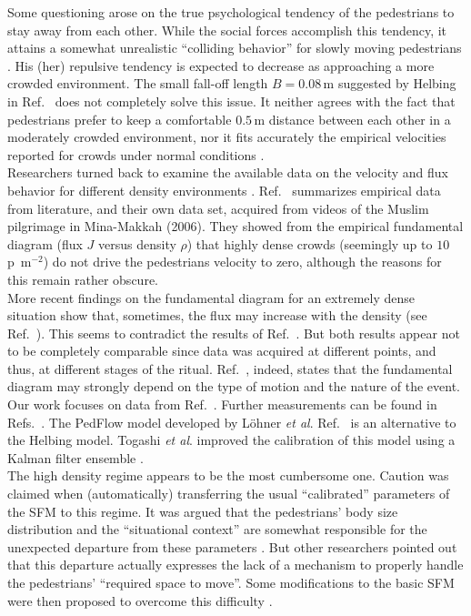 \documentclass[preprint,12pt]{elsarticle}
\begin{document}
Some questioning arose on the true psychological tendency of the pedestrians to 
stay away from each other. While the social forces accomplish this tendency, it 
attains a somewhat unrealistic ``colliding behavior'' for slowly moving 
pedestrians \cite{Lakoba}. His (her) repulsive tendency is expected to decrease 
as approaching a more crowded environment. The small fall-off length $B=0.08\,$m 
suggested by Helbing in Ref.~\cite{Helbing1} does not completely solve this 
issue. It neither agrees with the fact that pedestrians prefer to keep a 
comfortable $0.5\,$m distance between each other in a moderately crowded 
environment, nor it fits accurately the empirical velocities reported for 
crowds under normal conditions \cite{Lakoba}.  \\

Researchers turned back to examine the available data on the velocity and flux 
behavior for different density environments \cite{Boltes,helbing3,seyfried1,seyfried}. 
Ref.~\cite{helbing3} summarizes empirical data from 
literature, and their own data set, acquired from videos of the Muslim 
pilgrimage in Mina-Makkah (2006). They showed from the empirical fundamental 
diagram (flux $J$ versus density $\rho$) that highly dense crowds (seemingly up 
to $10\,$p~m$^{-2}$) do not drive the pedestrians velocity to zero, although the 
reasons for this remain rather obscure.   \\

More recent findings on the fundamental diagram for an extremely dense
 situation show that, sometimes, the flux may increase with the density (see 
Ref.~\cite{lohner1}). This seems to contradict the results of 
Ref.~\cite{helbing3}. But both results appear not to be completely  comparable 
since data was acquired at different points, and thus,
at different stages of the ritual. Ref.~\cite{lohner1}, indeed, states that the fundamental 
diagram may strongly depend on the type of motion and the nature of the event.\\


Our work focuses on data from Ref.~\cite{helbing3}. 
Further measurements can be found in 
Refs.~\cite{Boltes,lohner1,Dridi1,Dridi2,Baqui1}.
The PedFlow model developed by L\"ohner \textit{et al}. Ref.~\cite{lohner2}  
is an alternative to the Helbing model. Togashi \textit{et al}. improved the 
calibration of this model using a Kalman filter ensemble \cite{Togashi1}. \\

The high density regime appears to be the most cumbersome one. Caution was 
claimed when (automatically) transferring the usual ``calibrated'' parameters 
of the SFM to this regime. It was argued that the pedestrians' body size 
distribution and the ``situational context'' are somewhat responsible for the 
unexpected departure from these parameters \cite{kwak,johansson1}. But other 
researchers pointed out that this departure actually expresses the lack of a 
mechanism to properly handle the pedestrians' ``required space to move''. Some 
modifications to the basic SFM were then proposed to overcome this difficulty 
\cite{parisi2,seyfried2}. \\
\end{document}
